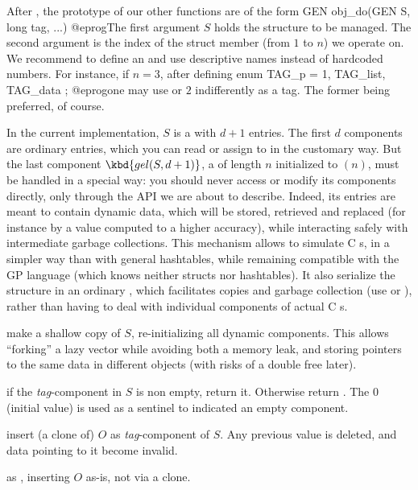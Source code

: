 After , the prototype of our other functions are of
the form
\bprog
  GEN obj_do(GEN S, long tag, ...)
@eprog\noindent The first argument $S$ holds the structure to be managed.
The second argument  is the index of the struct member (from $1$ to
$n$) we operate on. We recommend to define an  and use descriptive
names instead of hardcoded numbers. For instance, if $n = 3$, after defining
\bprog
  enum { TAG_p = 1, TAG_list, TAG_data };
@eprog\noindent one may use  or $2$ indifferently as a tag.
The former being preferred, of course.

In the current implementation, $S$ is a  with $d+1$ entries.
The first $d$ components are ordinary  entries, which you can
read or assign to in the customary way. But the last component $\kbd{gel(S,
d+1)}$, a  of length $n$ initialized to $(n)$, must
be handled in a special way: you should never access or modify its components
directly, only through the API we are about to describe. Indeed, its entries
are meant to contain dynamic data, which will be stored, retrieved and
replaced (for instance by a value computed to a higher accuracy), while
interacting safely with intermediate garbage collections. This mechanism
allows to simulate C s, in a simpler way than with general
hashtables, while remaining compatible with the GP language (which knows
neither structs nor hashtables). It also serialize the structure in an
ordinary , which facilitates copies and garbage collection (use
 or ), rather than having to deal with individual
components of actual C s.

 make a shallow copy of $S$, re-initializing
all dynamic components. This allows ``forking'' a lazy vector while
avoiding both a memory leak, and storing pointers to the same data
in different objects (with risks of a double free later).

 if the \emph{tag}-component in $S$
is non empty, return it. Otherwise return . The  $0$
(initial value) is used as a sentinel to indicated an empty component.

 insert (a clone of) $O$
as \emph{tag}-component of $S$. Any previous value is deleted, and
data pointing to it become invalid.

 as ,
inserting $O$ as-is, not via a clone.

